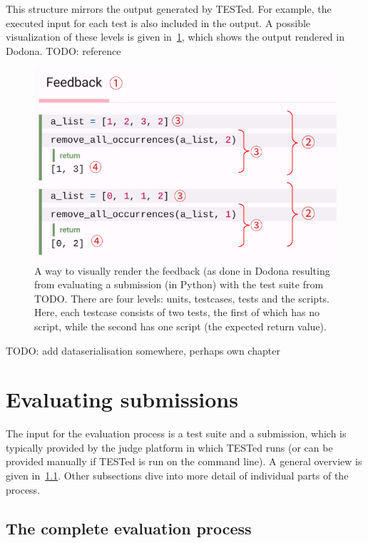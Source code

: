 \documentclass[../main]{subfiles}
\begin{document}
This structure mirrors the output generated by TESTed.
For example, the executed input for each test is also included in the output.
A possible visualization of these levels is given in~\cref{fig:dodona}, which shows the output rendered in Dodona.
TODO: reference

\begin{figure}
    \centering
    \includegraphics[scale=0.4]{dodona-rendering}
    \caption{A way to visually render the feedback (as done in Dodona resulting from evaluating a submission (in Python) with the test suite from TODO. There are four levels:  units,  testcases,  tests and  the scripts. Here, each testcase consists of two tests, the first of which has no script, while the second has one script (the expected return value).}
    \label{fig:dodona}
\end{figure}

TODO: add dataserialisation somewhere, perhaps own chapter

\section{Evaluating submissions}\label{sec:evaluating-submissions}

The input for the evaluation process is a test suite and a submission, which is typically provided by the judge platform in which TESTed runs (or can be provided manually if TESTed is run on the command line).
A general overview is given in~\cref{subsec:evaluation-process}.
Other subsections dive into more detail of individual parts of the process.

\subsection{The complete evaluation process}\label{subsec:evaluation-process}
\end{document}
